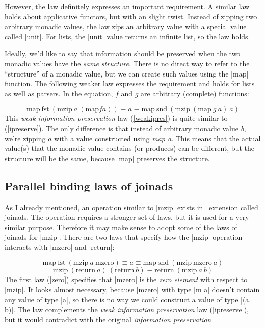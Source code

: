 \documentclass{tmr}
\begin{document}
However, the law definitely expresses an important requirement. A similar law holds about applicative 
functors, but with an slight twist. Instead of zipping two arbitrary monadic values, the law zips 
an arbitrary value with a special value called |unit|. For lists, the |unit| value 
returns an infinite list, so the law holds. 

Ideally, we'd like to say that information should be preserved when the two monadic values have 
the \textit{same structure}. There is no direct way to refer to the ``structure'' of a monadic 
value, but we can create such values using the |map| function. The following weaker law 
expresses the requirement and holds for lists as well as parsers. In the equation, $f$ and $g$ are 
arbitrary (complete) functions:

\begin{equation}
  \text{map} \: \text{fst} \: (\text{mzip} \: a \: (\text{map} f a)) \equiv a \equiv \text{map} \: \text{snd} \: (\text{mzip}\: (\text{map} \: g \: a) \: a)
  \label{weakipres}
\end{equation}
This \textit{weak information preservation} law (\ref{weakipres}) is quite similar to 
(\ref{ipreserve}). The only difference is that instead of arbitrary monadic value $b$, 
we're zipping $a$ with a value constructed using \textit{map a}. This means that 
the actual value(s) that the monadic value contains (or produces) can be different, but the 
structure will be the same, because |map| preserves the structure. 

\subsection{Parallel binding laws of joinads}
As I already mentioned, an operation similar to |mzip| exists in \fsharp \ extension called joinads.
The operation requires a stronger set of laws, but it is used for a very similar purpose. Therefore
it may make sense to adopt some of the laws of joinads for |mzip|. There are two laws that specify
how the |mzip| operation interacts with |mzero| and |return|:

\begin{equation}
  \text{map} \: \text{fst} \: (\text{mzip} \: a \: \text{mzero}) \equiv a \equiv \text{map} \: \text{snd} \: (\text{mzip} \: \text{mzero} \: a)
  \label{zero}
\end{equation}
\begin{equation}
  \text{mzip} \: (\text{return} \: a) \: (\text{return} \: b) \equiv \text{return} \: (\text{mzip} \: a \: b)
  \label{unitmerge}
\end{equation}
The first law (\ref{zero}) specifies that |mzero| is the \textit{zero element} with respect to 
|mzip|. It looks almost necessary, because |mzero| with type |m a| doesn't contain any value of 
type |a|, so there is no way we could construct a value of type |(a, b)|. The law complements the 
\textit{weak information preservation} law (\ref{ipreserve}), but it would contradict with the 
original \textit{information preservation} 
\end{document}
